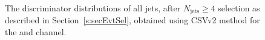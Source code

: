 \begin{center}
\begin{figure}
\caption{The \PQb discriminator distributions of all jets, after $N_{\text{jets}} \geq 4$ selection as described in Section~\ref{s:secEvtSel}, obtained using CSVv2 method for the \mujets and \ejets channel.}
\label{fig:pfCISV_lepBTag}
\end{figure}
\end{center}

